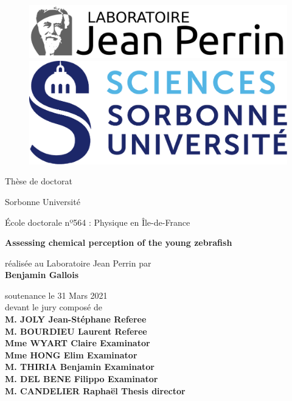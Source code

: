 \thispagestyle{empty}
	
	\begin{figure}[ht]
			\includegraphics[scale=0.5]{cover/ljp.png}
	   \endminipage
			\includegraphics[scale=0.5]{cover/su.png}
		\endminipage
	\end{figure}
	
	\begin{center}
	\vspace{0.3cm}
	\LARGE
	Thèse de doctorat 
	
	\vspace{.1cm}
	\LARGE
	Sorbonne Université

	\vspace{.2cm}
	\Large
  École doctorale nº564 : Physique en Île-de-France
	
	\vspace{1cm}	
	\Large
	\textbf{Assessing chemical perception of the young zebrafish}

	\vspace{1cm}
	\normalsize	
	réalisée au Laboratoire Jean Perrin par \\
	\vspace{.2cm}
	\large
	\textbf{Benjamin Gallois}
	
	\vspace{.3cm}
	\normalsize	
	soutenance le 31 Mars 2021 \\
	\vspace{.1cm}
	\normalsize	
	devant le jury composé de \\
	\vspace{.3cm}
	\large
	\textbf{M. JOLY Jean-Stéphane \hfill Referee} \\
	\textbf{M. BOURDIEU Laurent \hfill Referee} \\
	\textbf{Mme WYART Claire \hfill Examinator} \\
	\textbf{Mme HONG Elim \hfill Examinator} \\
	\textbf{M. THIRIA Benjamin \hfill Examinator} \\
	\textbf{M. DEL BENE Filippo \hfill Examinator} \\
	\textbf{M. CANDELIER Raphaël \hfill Thesis director} \\
	
	\vspace{1.3cm}
	\end{center}
